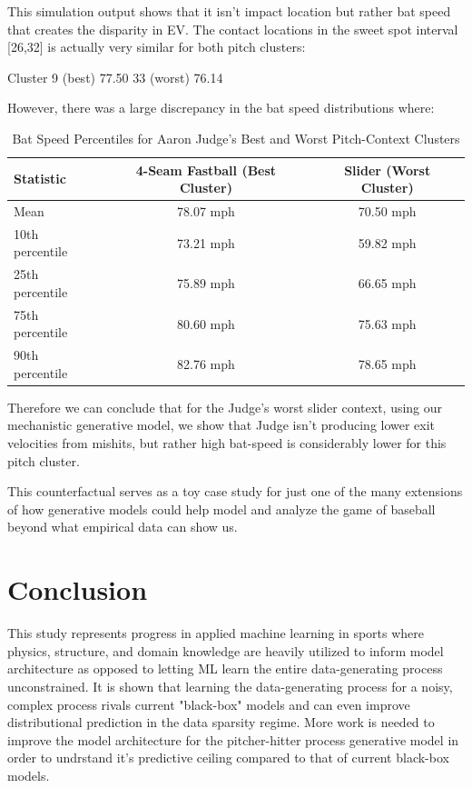 \documentclass[11pt]{article}
\begin{document}
This simulation output shows that it isn't impact location but rather bat speed that creates the disparity in EV. The contact locations in the sweet spot interval [26,32] is actually very similar for both pitch clusters:

Cluster	%
9 (best)
77.50%
33 (worst)
76.14%

However, there was a large discrepancy in the bat speed distributions where:

\begin{table}[H]
\centering
\caption{Bat Speed Percentiles for Aaron Judge's Best and Worst Pitch-Context Clusters}
\label{tab:judge_bat_speed_percentiles}
\begin{tabular}{lcc}
\hline
\textbf{Statistic} & \textbf{4-Seam Fastball (Best Cluster)} & \textbf{Slider (Worst Cluster)} \\
\hline
Mean              & 78.07 mph & 70.50 mph \\
10th percentile   & 73.21 mph & 59.82 mph \\
25th percentile   & 75.89 mph & 66.65 mph \\
75th percentile   & 80.60 mph & 75.63 mph \\
90th percentile   & 82.76 mph & 78.65 mph \\
\hline
\end{tabular}
\end{table}

Therefore we can conclude that for the Judge's worst slider context, using our mechanistic generative model, we show that Judge isn't producing lower exit velocities from mishits, but rather high bat-speed is considerably lower for this pitch cluster.

This counterfactual serves as a toy case study for just one of the many extensions of how generative models could help model and analyze the game of baseball beyond what empirical data can show us.

\section{Conclusion}

This study represents progress in applied machine learning in sports where physics, structure, and domain knowledge are heavily utilized to inform model architecture as opposed to letting ML learn the entire data-generating process unconstrained. It is shown that learning the data-generating process for a noisy, complex process rivals current "black-box" models and can even improve distributional prediction in the data sparsity regime. More work is needed to improve the model architecture for the pitcher-hitter process generative model in order to undrstand it's predictive ceiling compared to that of current black-box models.
\end{document}
